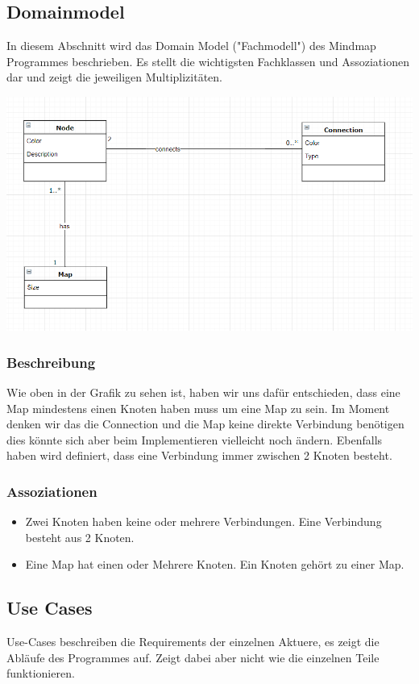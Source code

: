 \documentclass[a4paper,parskip]{scrartcl}
\begin{document}
\subsection{Domainmodel}
In diesem Abschnitt wird das Domain Model ("{}Fachmodell"{}) des Mindmap Programmes beschrieben. Es stellt die 
wichtigsten Fachklassen und Assoziationen dar und zeigt die jeweiligen Multiplizitäten.

\includegraphics[width=\linewidth]{DomainModel.PNG}

\subsubsection{Beschreibung}
Wie oben in der Grafik zu sehen ist, haben wir uns dafür entschieden, dass eine Map mindestens einen Knoten haben muss um eine Map zu sein. Im Moment denken wir das die Connection und die Map keine direkte Verbindung benötigen dies könnte sich aber beim Implementieren vielleicht noch ändern. Ebenfalls haben wird definiert, dass eine Verbindung immer zwischen 2 Knoten besteht.

\subsubsection{Assoziationen}
\begin{itemize}
\item Zwei Knoten haben keine oder mehrere Verbindungen. Eine Verbindung besteht aus 2 Knoten.
\item Eine Map hat einen oder Mehrere Knoten. Ein Knoten gehört zu einer Map.
\end{itemize}

\subsection{Use Cases}
Use-Cases beschreiben die Requirements der einzelnen Aktuere, es zeigt die Abläufe des Programmes auf. Zeigt dabei aber nicht wie die einzelnen Teile funktionieren.
\end{document}
